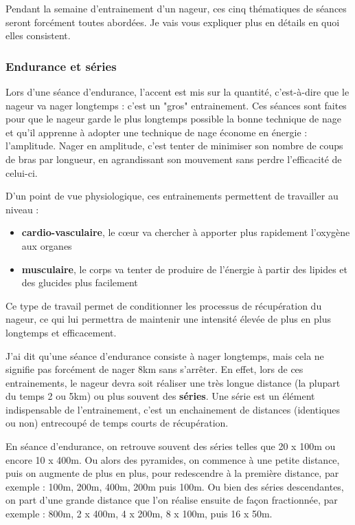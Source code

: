 Pendant la semaine d'entrainement d'un nageur, ces cinq thématiques de séances seront forcément toutes abordées. Je vais vous expliquer plus en détails en quoi elles consistent.

\subsubsection{Endurance et séries}

Lors d'une séance d'endurance, l'accent est mis sur la quantité, c'est-à-dire que le nageur va nager longtemps : c'est un "gros" entrainement. Ces séances sont faites pour que le nageur garde le plus longtemps possible la bonne technique de nage et qu'il apprenne à adopter une technique de nage économe en énergie : l'amplitude. Nager en amplitude, c'est tenter de minimiser son nombre de coups de bras par longueur, en agrandissant son mouvement sans perdre l'efficacité de celui-ci.

\vspace{12pt}

D'un point de vue physiologique, ces entrainements permettent de travailler au niveau :

\begin{itemize}
\item \textbf{cardio-vasculaire}, le cœur va chercher à apporter plus rapidement l'oxygène aux organes
\item \textbf{musculaire}, le corps va tenter de produire de l'énergie à partir des lipides et des glucides plus facilement
\end{itemize}

\vspace{12pt}

Ce type de travail permet de conditionner les processus de récupération du nageur, ce qui lui permettra de maintenir une intensité élevée de plus en plus longtemps et efficacement.

\vspace{12pt}

J'ai dit qu'une séance d'endurance consiste à nager longtemps, mais cela ne signifie pas forcément de nager 8km sans s'arrêter. En effet, lors de ces entrainements, le nageur devra soit réaliser une très longue distance (la plupart du temps 2 ou 5km) ou plus souvent des \textbf{séries}. Une série est un élément indispensable de l'entrainement, c'est un enchainement de distances (identiques ou non) entrecoupé de temps courts de récupération.

En séance d'endurance, on retrouve souvent des séries telles que 20 x 100m ou encore 10 x 400m. Ou alors des pyramides, on commence à une petite distance, puis on augmente de plus en plus, pour redescendre à la première distance, par exemple : 100m, 200m, 400m, 200m puis 100m. Ou bien des séries descendantes, on part d'une grande distance que l'on réalise ensuite de façon fractionnée, par exemple : 800m, 2 x 400m, 4 x 200m, 8 x 100m, puis 16 x 50m.

